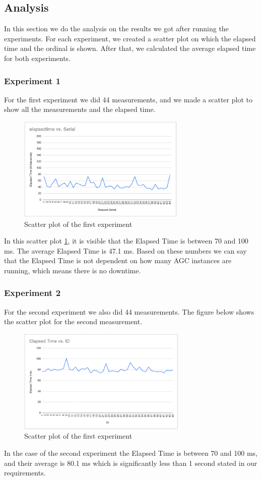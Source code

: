\subsection{Analysis}
\label{sec:analysis}
In this section we do the analysis on the results we got after running the experiments. For each experiment, we created a scatter plot on which the elapsed time and the ordinal is shown. After that, we calculated the average elapsed time for both experiments.

\subsubsection{Experiment 1}
For the first experiment we did 44 measurements, and we made a scatter plot to show all the measurements and the elapsed time.


\begin{figure}[ht]
\centering
  \includegraphics[height=5cm]{images/experiment_1_plot.png}
  \caption{Scatter plot of the first experiment}
  \label{fig:experiment_1_plot}
\end{figure}


In this scatter plot \ref{fig:experiment_1_plot}, it is visible that the Elapsed Time is between 70 and 100 ms. The average Elapsed Time is 47.1 ms. Based on these numbers we can say that the Elapsed Time is not dependent on how many AGC instances are running, which means there is no downtime.
\subsubsection{Experiment 2}
For the second experiment we also did 44 measurements. The figure below shows the scatter plot for the second measurement.

\begin{figure}[ht]
\centering
  \includegraphics[height=5cm]{images/experiment_2_plot.png}
  \caption{Scatter plot of the first experiment}
  \label{fig:experiment_2_plot}
\end{figure}

In the case of the second experiment the Elapsed Time is between 70 and 100 ms, and their average is 80.1 ms which is significantly less than 1 second stated in our requirements.